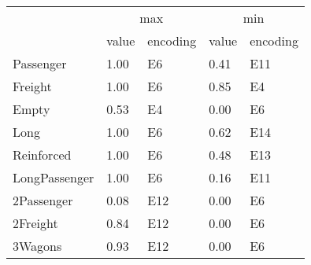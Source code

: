 \begin{tabular}{lllll}
\toprule
 & \multicolumn{2}{c}{max} & \multicolumn{2}{c}{min} \\
 & value & encoding & value & encoding \\
\midrule
Passenger & 1.00 & E6 & 0.41 & E11 \\
Freight & 1.00 & E6 & 0.85 & E4 \\
Empty & 0.53 & E4 & 0.00 & E6 \\
Long & 1.00 & E6 & 0.62 & E14 \\
Reinforced & 1.00 & E6 & 0.48 & E13 \\
LongPassenger & 1.00 & E6 & 0.16 & E11 \\
2Passenger & 0.08 & E12 & 0.00 & E6 \\
2Freight & 0.84 & E12 & 0.00 & E6 \\
3Wagons & 0.93 & E12 & 0.00 & E6 \\
\bottomrule
\end{tabular}
